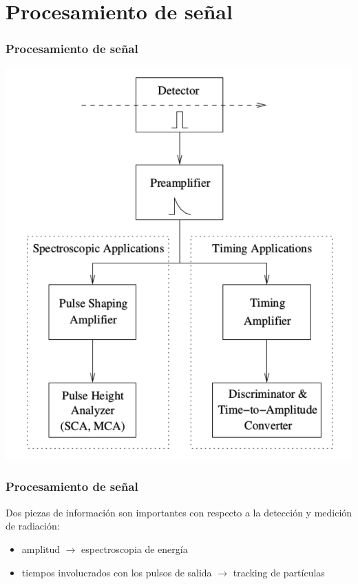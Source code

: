 \documentclass{beamer}
\begin{document}
\section{Procesamiento de señal}

\begin{frame}
\frametitle{Procesamiento de señal}
\begin{center}
\includegraphics[width=.5\textwidth]{d2/typical_asp} 
\end{center}
\end{frame} 
\begin{frame}
\frametitle{Procesamiento de señal}
Dos piezas de información son importantes con respecto a la detección y medición de radiación:
\begin{itemize}
\item amplitud $\rightarrow$ espectroscopia de energía
\item tiempos involucrados con los pulsos de salida $\rightarrow$ tracking de partículas
\end{itemize} 
\end{frame} 

\end{document}
